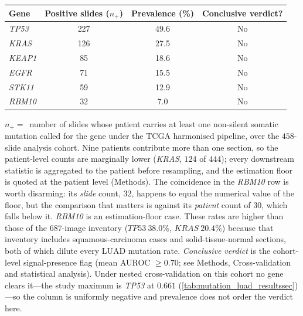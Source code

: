 \small
\setlength{\tabcolsep}{8pt}
\begin{tabular}{l c c c}
\toprule
\textbf{Gene} & \textbf{Positive slides} ($n_{+}$) &
  \textbf{Prevalence} (\%) & \textbf{Conclusive verdict?} \\
\midrule
\textit{TP53}  & 227 & 49.6 & No \\
\textit{KRAS}  & 126 & 27.5 & No \\
\textit{KEAP1} &  85 & 18.6 & No \\
\textit{EGFR}  &  71 & 15.5 & No \\
\textit{STK11} &  59 & 12.9 & No \\
\textit{RBM10} &  32 &  7.0 & No \\
\bottomrule
\end{tabular}
\begin{flushleft}\footnotesize
$n_{+}\!=\!$~number of slides whose patient carries at least one
non-silent somatic mutation called for the gene under the TCGA
harmonised pipeline, over the $458$-slide analysis cohort.
Nine patients contribute more than one section, so the patient-level
counts are marginally lower (\textit{KRAS}, $124$ of $444$); every
downstream statistic is aggregated to the patient before resampling,
and the estimation floor is quoted at the patient level (Methods).
The coincidence in the \textit{RBM10} row is worth disarming: its
\emph{slide} count, $32$, happens to equal the numerical value of the
floor, but the comparison that matters is against its \emph{patient}
count of $30$, which falls below it. \textit{RBM10} is an
estimation-floor case.
These rates are higher than those of the $687$-image inventory
($\textit{TP53}\ 38.0\%$, $\textit{KRAS}\ 20.4\%$) because that
inventory includes squamous-carcinoma cases and solid-tissue-normal
sections, both of which dilute every LUAD mutation rate.
\emph{Conclusive verdict} is the cohort-level signal-presence flag
(mean AUROC $\geq\!0.70$; see Methods, Cross-validation and
statistical analysis). Under nested cross-validation on this cohort no
gene clears it---the study maximum is \textit{TP53} at $0.661$
(\cref{tab:mutation_luad_resultssec})---so the column is uniformly
negative and prevalence does not order the verdict here.
\end{flushleft}
